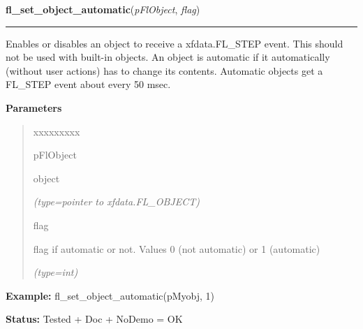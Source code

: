 \hspace{.8\funcindent}\begin{boxedminipage}{\funcwidth}

    \raggedright \textbf{fl\_set\_object\_automatic}(\textit{pFlObject}, \textit{flag})

    \vspace{-1.5ex}

    \rule{\textwidth}{0.5\fboxrule}
\setlength{\parskip}{2ex}
    Enables or disables an object to receive a xfdata.FL\_STEP event. This 
    should not be used with built-in objects. An object is automatic if it 
    automatically (without user actions) has to change its contents. 
    Automatic objects get a FL\_STEP event about every 50 msec.

\setlength{\parskip}{1ex}
      \textbf{Parameters}
      \vspace{-1ex}

      \begin{quote}
        \begin{Ventry}{xxxxxxxxx}

          \item[pFlObject]

          object

            {\it (type=pointer to xfdata.FL\_OBJECT)}

          \item[flag]

          flag if automatic or not. Values 0 (not automatic) or 1 
          (automatic)

            {\it (type=int)}

        \end{Ventry}

      \end{quote}

\textbf{Example:} fl\_set\_object\_automatic(pMyobj, 1)



\textbf{Status:} Tested + Doc + NoDemo = OK



    \end{boxedminipage}

    \label{xformslib:flbasic:fl_object_is_automatic}

    \vspace{0.5ex}


